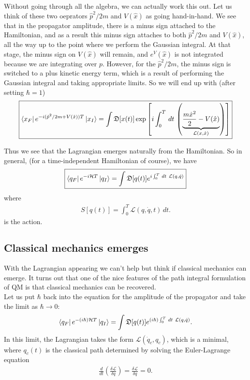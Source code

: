 \documentclass{book}
\theoremstyle{definition}
\newcommand{\lag}{\mathcal{L}}
\newcommand{\ham}{\mathcal{H}}
\newcommand{\f}[2]{\frac{#1}{#2}}
\newcommand{\lp}{\left(}
\newcommand{\rp}{\right)}
\newcommand{\lb}{\left[}
\newcommand{\rb}{\right]}
\begin{document}
Without going through all the algebra, we can actually work this out. Let us think of these two oeprators $\hat{p}^2/2m$ and $V(\hat{x})$ as going hand-in-hand. We see that in the propagator amplitude, there is a minus sign attached to the Hamiltonian, and as a result this minus sign attaches to both $\hat{p}^2/2m$ and $V(\hat{x})$, all the way up to the point where we perform the Gaussian integral. At that stage, the minus sign on $V(\hat{x})$ will remain, and $e^V(\hat{x})$ is not integrated because we are integrating over $p$. However, for the $\hat{p}^2/2m$, the minus sign is switched to a plus kinetic energy term, which is a result of performing the Gaussian integral and taking appropriate limits. So we will end up with (after setting $\hbar = 1$)
\begin{align}
\boxed{\bra{x_F}  e^{-i(\hat{p}^2/2m + V(\hat{x}))T }  \ket{x_I} = \int \mathfrak{D}[x(t)]\exp\lb i\int_0^T \,dt \, \lp\underbrace{ \f{m\dot{x}^2}{2} - V(\hat{x})}_{\lag(x,\dot{x}) } \rp \rb}
\end{align} 




Thus we see that the Lagrangian emerges naturally from the Hamiltonian. So in general, (for a time-independent Hamiltonian of course), we have
\begin{align}
\boxed{\bra{q_F} e^{-i\ham T }\ket{q_I} = \int \mathfrak{D}[q(t)] e^{i \int^T_0  \,dt\ \lag(q,\dot{q}) }}
\end{align}
where
\begin{align}
S[q(t)] = \int_0^T \lag(q,\dot{q}, t)\,dt.
\end{align}
is the action. 




\subsection{Classical mechanics emerges}

With the Lagrangian appearing we can't help but think if classical mechanics can emerge. It turns out that one of the nice features of the path integral formulation of QM is that classical mechanics can be recovered. \\

Let us put $\hbar$ back into the equation for the amplitude of the propagator and take the limit as $\hbar \to 0$:
\begin{align}
\bra{q_F} e^{-(i\hbar)\ham T }\ket{q_I} = \int \mathfrak{D}[q(t)] e^{(i\hbar) \int^T_0  \,dt\ \lag(q,\dot{q}) }.
\end{align}
In this limit, the Lagrangian takes the form $\lag(\dot{q}_c , q_c)$, which is a minimal, where $q_c(t)$ is the classical path determined by solving the Euler-Lagrange equation
\begin{align}
\f{d}{dt}\lp \f{\delta \lag}{\delta \dot{q}} \rp = \f{\delta \lag}{\delta q} = 0.
\end{align} 
\end{document}
